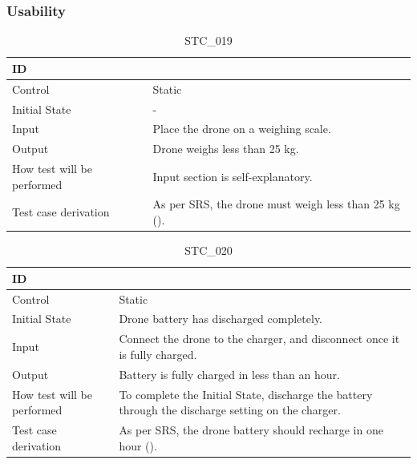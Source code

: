 \documentclass[12pt, titlepage]{article}
\begin{document}
\clearpage

\subsubsection{Usability}

\begin{table}[!h]
\begin{center}
\caption {STC\_019}
\label{tab:STC_019}
\begin{tabular}{ | m{3.2cm} | m{12.2cm} | } 
\hline
ID & \nameref{tab:STC_019} \\ 
\hline
Control & Static \\ 
\hline
Initial State & - \\ 
\hline
Input & Place the drone on a weighing scale. \\ 
\hline
Output &  Drone weighs less than 25 kg. \\ 
\hline
How test will be performed & Input section is self-explanatory. \\ 
\hline
Test case derivation & As per SRS, the drone must weigh less than 25 kg (\nameref{STD_001}).
 \\ 
\hline
\end{tabular}
\end{center}
\end{table}

\begin{table}[!h]
\begin{center}
\caption {STC\_020}
\label{tab:STC_020}
\begin{tabular}{ | m{3.2cm} | m{12.2cm} | } 
\hline
ID & \nameref{tab:STC_020} \\ 
\hline
Control & Static \\ 
\hline
Initial State & Drone battery has discharged completely. \\ 
\hline
Input & Connect the drone to the charger, and disconnect once it is fully charged. \\ 
\hline
Output & Battery is fully charged in less than an hour. \\ 
\hline
How test will be performed & To complete the Initial State, discharge the battery through the discharge setting on the charger.
 \\ 
\hline
Test case derivation & As per SRS, the drone battery should recharge in one hour (\nameref{MTNC_001}).
 \\ 
\hline
\end{tabular}
\end{center}
\end{table}
\end{document}
